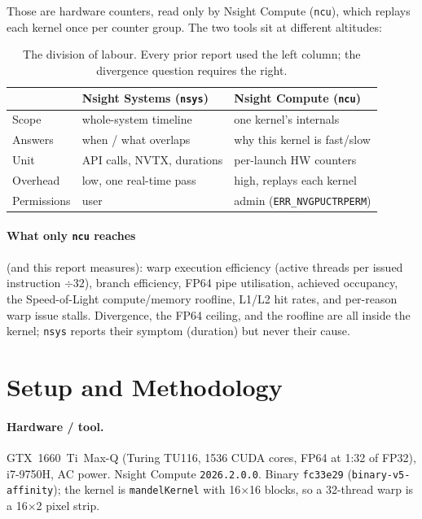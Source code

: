 \documentclass[
	english,
	letterpaper, oneside
]{article}
\begin{document}
Those are hardware counters, read only by Nsight Compute
(\texttt{ncu}), which replays each kernel once per counter group. The two tools
sit at different altitudes:

\begin{table}[H]
    \centering
    \caption{The division of labour. Every prior report used the left column;
             the divergence question requires the right.}
    \label{tab:tools}
    \begin{tabular}{lll}
        \hline
        & Nsight Systems (\texttt{nsys}) & Nsight Compute (\texttt{ncu}) \\
        \hline
        Scope        & whole-system timeline          & one kernel's internals \\
        Answers       & when / what overlaps     & why this kernel is fast/slow \\
        Unit          & API calls, NVTX, durations      & per-launch HW counters \\
        Overhead      & low, one real-time pass         & high, replays each kernel \\
        Permissions   & user                            & admin (\texttt{ERR\_NVGPUCTRPERM}) \\
        \hline
    \end{tabular}
\end{table}

\paragraph{What only \texttt{ncu} reaches} (and this report measures): warp
execution efficiency (active threads per issued instruction $\div32$), branch
efficiency, FP64 pipe utilisation, achieved occupancy, the Speed-of-Light
compute/memory roofline, L1/L2 hit rates, and per-reason warp issue stalls.
Divergence, the FP64 ceiling, and the roofline are all inside the kernel;
\texttt{nsys} reports their symptom (duration) but never their cause.

\section{Setup and Methodology}

\paragraph{Hardware / tool.} GTX~1660~Ti~Max-Q (Turing TU116, 1536 CUDA cores,
FP64 at 1:32 of FP32), i7-9750H, AC power. Nsight Compute \texttt{2026.2.0.0}.
Binary \texttt{fc33e29} (\texttt{binary-v5-affinity}); the kernel is
\texttt{mandelKernel} with 16$\times$16 blocks, so a 32-thread warp is a
16$\times$2 pixel strip.
\end{document}
